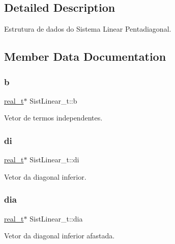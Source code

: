 \subsection{Detailed Description}
Estrutura de dados do Sistema Linear Pentadiagonal. 

\subsection{Member Data Documentation}
\mbox{\label{structSistLinear__t_a5f554632eec68e5e0dbea0058c9657ac}} 
\subsubsection{\texorpdfstring{b}{b}}
{\footnotesize\ttfamily \hyperlink{SistemasLineares_8h_a0d00e2b3dfadee81331bbb39068570c4}{real\+\_\+t}$\ast$ Sist\+Linear\+\_\+t\+::b}

Vetor de termos independentes. \mbox{\label{structSistLinear__t_a86345c5459d538c556dba797dccfede7}} 
\subsubsection{\texorpdfstring{di}{di}}
{\footnotesize\ttfamily \hyperlink{SistemasLineares_8h_a0d00e2b3dfadee81331bbb39068570c4}{real\+\_\+t}$\ast$ Sist\+Linear\+\_\+t\+::di}

Vetor da diagonal inferior. \mbox{\label{structSistLinear__t_ac61f29d6df1c08a55d9d571fcb82bf53}} 
\subsubsection{\texorpdfstring{dia}{dia}}
{\footnotesize\ttfamily \hyperlink{SistemasLineares_8h_a0d00e2b3dfadee81331bbb39068570c4}{real\+\_\+t}$\ast$ Sist\+Linear\+\_\+t\+::dia}

Vetor da diagonal inferior afastada. \mbox{\label{structSistLinear__t_aa7f879f3d335e7973af826bc65df4a49}} 
